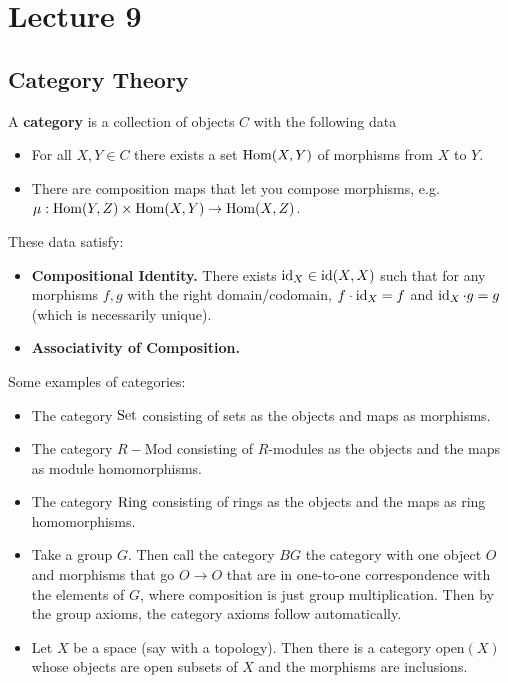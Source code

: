 \section{Lecture 9}
\subsection{Category Theory}
\begin{definition}
    A \textbf{category} is a collection of objects $C$ with the following data
    \begin{itemize}
        \item For all $X, Y \in C$ there exists a set $\operatorname{Hom}(X, Y)$ of morphisms from $X$ to $Y$.
        \item There are composition maps that let you compose morphisms,
        e.g. $\mu: \operatorname{Hom}(Y, Z) \times \operatorname{Hom}(X, Y) \to \operatorname{Hom}(X, Z)$.
    \end{itemize}
    These data satisfy:
    \begin{itemize}
        \item \textbf{Compositional Identity.} There exists $\operatorname{id}_X \in \operatorname{id}(X, X)$
        such that for any morphisms $f, g$ with the right domain/codomain,
        $f \cdot \operatorname{id}_X = f$ and $\operatorname{id}_X \cdot g = g$ (which is necessarily unique).
        \item \textbf{Associativity of Composition.}
    \end{itemize}
\end{definition}

Some examples of categories:
\begin{itemize}
    \item The category $\operatorname{Set}$ consisting of sets as the objects and maps as morphisms.
    \item The category $R-\textrm{Mod}$ consisting of $R$-modules as the objects and the maps as module homomorphisms.
    \item The category $\operatorname{Ring}$ consisting of rings as the objects and the maps as ring homomorphisms.
    \item Take a group $G$.
    Then call the category $BG$ the category with one object $O$ and morphisms
    that go $O \to O$ that are in one-to-one correspondence with the elements of $G$,
    where composition is just group multiplication.
    Then by the group axioms, the category axioms follow automatically.
    \item Let $X$ be a space (say with a topology). Then there is a category $\textrm{open}(X)$
    whose objects are open subsets of $X$ and the morphisms are inclusions.
\end{itemize}

